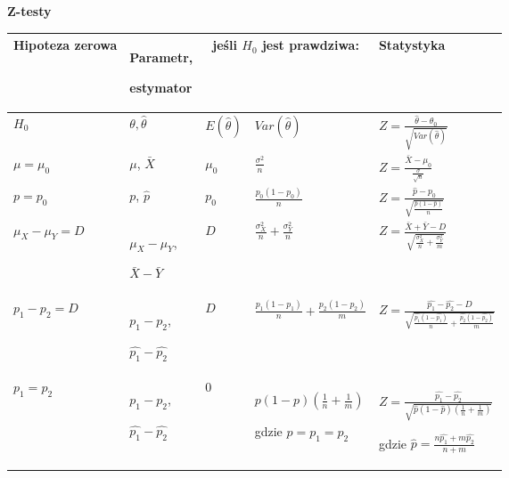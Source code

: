 \documentclass[12pt]{article}
\begin{document}
    \textbf{Z-testy}

    \begin{table}[H]
        \begin{center}
            \begin{tabular}{ p{2.5cm} |p{2.5cm} |p{1.5cm} |p{4cm} |p{4cm}}
                \toprule
                Hipoteza zerowa & Parametr,

                estymator & \multicolumn{2}{c|}{jeśli $H_0$ jest prawdziwa:} & Statystyka \\
                \toprule

                $H_0$ & $\theta, \hat{\theta}$ & $E(\hat{\theta})$ & $Var(\hat{\theta})$ & $Z = \frac{\hat{\theta} - \theta_0}{\sqrt{Var(\hat{\theta})}}$\\

                \cmidrule(r){1-5}

                $\mu = \mu_0$ & $\mu$, $\bar{X}$ & $\mu_0$ & $\frac{\sigma^2}{n}$ & $Z = \frac{\bar{X} - \mu_0}{\frac{\sigma}{\sqrt{n}}}$\\

                \cmidrule(r){1-5}

                $p = p_0$ & $p$, $\hat{p}$ & $p_0$ & $\frac{p_0(1-p_0)}{n}$ & $Z = \frac{\hat{p} - p_0}{\sqrt{\frac{\hat{p}(1-\hat{p})}{n}}}$\\

                \cmidrule(r){1-5}

                $\mu_X - \mu_Y = D$ &
                $\mu_X - \mu_Y$,

                $\bar{X} - \bar{Y}$
                & $D$ & $\frac{\sigma_X^2}{n} + \frac{\sigma_Y^2}{n}$ & $Z = \frac{\bar{X} + \bar{Y} - D}{\sqrt{\frac{\sigma_X^2}{n} + \frac{\sigma_Y^2}{m}}}$\\

                \cmidrule(r){1-5}

                $p_1 - p_2 = D$ & $p_1 - p_2$,

                $\hat{p_1} - \hat{p_2}$
                & $D$ & $\frac{p_1(1-p_1)}{n} + \frac{p_2(1-p_2)}{m}$ &
                $Z = \frac{\hat{p_1} - \hat{p_2} - D}{\sqrt{\frac{\hat{p_1}(1-\hat{p_1})}{n} + \frac{\hat{p_2}(1-\hat{p_2})}{m}}}$\\

                \cmidrule(r){1-5}

                $p_1 = p_2$ & $p_1 - p_2$,

                $\hat{p_1} - \hat{p_2}$ & $0$ & $p(1-p)(\frac{1}{n} + \frac{1}{m})$

                gdzie $p = p_1 = p_2$ & $Z = \frac{\hat{p_1} - \hat{p_2}}{\sqrt{\hat{p}(1-\hat{p})(\frac{1}{n} + \frac{1}{m})}}$

                gdzie $\hat{p} = \frac{n\hat{p_1} + m\hat{p_2}}{n + m}$\\
                \bottomrule
            \end{tabular}
        \end{center}
    \end{table}
\end{document}
